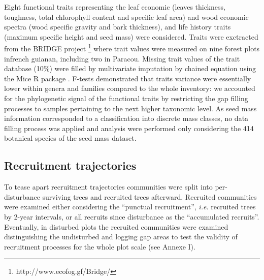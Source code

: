 \documentclass[fleqn,10pt]{ArtEcoFoG} %
\begin{document}
Eight functional traits representing the leaf economic (leaves
thickness, toughness, total chlorophyll content and specific leaf area)
and wood economic spectra (wood specific gravity and bark thickness),
and life history traits (maximum specific height and seed mass) were
considered. Traits were exctracted from the BRIDGE project \footnote{http://www.ecofog.gf/Bridge/}
where trait values were measured on nine forest plots infrench guianan,
including two in Paracou. Missing trait values of the trait database
(10\%) were filled by multivariate imputation by chained equation using
the Mice R package \citep{Mice2011}. F-tests demonstrated that traits
variance were essentially lower within genera and families compared to
the whole inventory: we accounted for the phylogenetic signal of the
functional traits by restricting the gap filling processes to samples
pertaining to the next higher taxonomic level. As seed mass information
corresponded to a classification into discrete mass classes, no data
filling process was applied and analysis were performed only considering
the 414 botanical species of the seed mass dataset.

\subsection{Recruitment trajectories}\label{recruitment-trajectories}

To tease apart recruitment trajectories communities were split into
per-disturbance surviving trees and recruited trees afterward. Recruited
communities were examined either considering the ``punctual
recruitment'', \emph{i.e.} recruited trees by 2-year intervals, or all
recruits since disturbance as the ``accumulated recruits''. Eventually,
in disturbed plots the recruited communities were examined
distinguishing the undisturbed and logging gap areas to test the
validity of recruitment processes for the whole plot scale (see Annexe
I).
\end{document}
